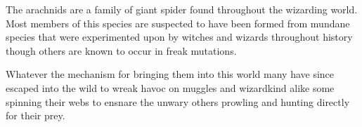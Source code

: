 {
	The arachnids are a family of giant spider found throughout the wizarding world. Most members of this species are suspected to have been formed from mundane species that were experimented upon by witches and wizards throughout history\comma{} though others are known to occur in freak mutations. 

Whatever the mechanism for bringing them into this world\comma{} many have since escaped into the wild\comma{} to wreak havoc on muggles and wizardkind alike \minus{} some spinning their webs to ensnare the unwary\comma{} others prowling and hunting directly for their prey. 



}
